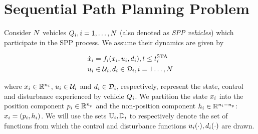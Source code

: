 \section{Sequential Path Planning Problem \label{sec:formulation}}
Consider $N$ vehicles $Q_i, i = 1, \ldots, N$ (also denoted as \textit{SPP vehicles}) which participate in the SPP process. We assume their dynamics are given by

\begin{equation}
\label{eq:dyn}
\begin{aligned}
\dot\state_i &= \fdyn_i(\state_i, \ctrl_i, \dstb_i), t \le \sta_i \\
\ctrl_i &\in \cset_i, \dstb_i \in \dset_i, i = 1 \ldots, \N
\end{aligned}
\end{equation}

\noindent where $x_i \in \mathbb{R}^{n_i}$, $u_i \in \mathcal{U}_i$ and $d_i \in \mathcal{D}_i$, respectively, represent the state, control and disturbance experienced by vehicle $Q_i$. We partition the state $x_i$ into the position component $p_i \in \mathbb{R}^{n_p}$ and the non-position component $h_i \in \mathbb{R}^{n_i - n_p}$: $x_i = (p_i, h_i)$. %
We will use the sets $\mathbb{U}_i, \mathbb{D}_i$ to respectively denote the set of functions from which the control and disturbance functions $u_i(\cdot), d_i(\cdot)$ are drawn.


